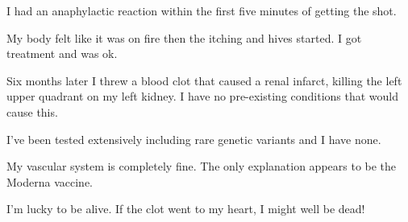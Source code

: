 I had an anaphylactic reaction within the first five minutes of getting the
shot.

My body felt like it was on fire then the itching and hives started. I got
treatment and was ok.

Six months later I threw a blood clot that caused a renal infarct, killing the
left upper quadrant on my left kidney. I have no pre-existing conditions that
would cause this.

I’ve been tested extensively including rare genetic variants and I have none.

My vascular system is completely fine. The only explanation appears to be the
Moderna vaccine.

I’m lucky to be alive. If the clot went to my heart, I might well be dead!

